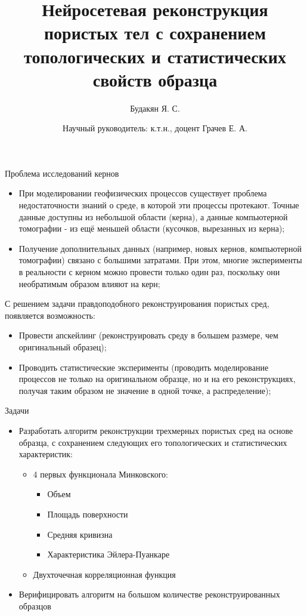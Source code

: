 \documentclass[10pt, handout, aspectratio=169]{beamer}
\begin{document}
	\title{Нейросетевая реконструкция пористых тел с сохранением топологических и статистических свойств образца}
	\author{Будакян Я. С. \and \break \break \break Научный руководитель: к.т.н., доцент Грачев Е. А.}
	\maketitle
	
	\begin{frame}{Проблема исследований кернов}
		\begin{itemize}
			\item При моделировании геофизических процессов существует проблема недостаточности знаний о среде, в которой эти процессы протекают. Точные данные доступны из небольшой области (керна), а данные компьютерной томографии - из ещё меньшей области (кусочков, вырезанных из керна);
			\item Получение дополнительных данных (например, новых кернов, компьютерной томографии) связано с большими затратами. При этом, многие эксперименты в реальности с керном можно провести только один раз, поскольку они необратимым образом влияют на керн;
		\end{itemize}
	С решением задачи правдоподобного реконструирования пористых сред, появляется возможность:
		\begin{itemize}
			\item Провести апскейлинг (реконструировать среду в большем размере, чем оригинальный образец);
			\item Проводить статистические эксперименты (проводить моделирование процессов не только на оригинальном образце, но и на его реконструкциях, получая таким образом не значение в одной точке, а распределение);
		\end{itemize}
	\end{frame}

	\begin{frame}{Задачи}
		\begin{itemize}
			\item Разработать алгоритм реконструкции трехмерных пористых сред на основе образца, с сохранением следующих его топологических и статистических характеристик:
			\begin{itemize}
				\item 4 первых функционала Минковского:
				\begin{itemize}
					\item Объем
					\item Площадь поверхности
					\item Средняя кривизна
					\item Характеристика Эйлера-Пуанкаре
				\end{itemize}
				\item Двухточечная корреляционная функция
			\end{itemize}
			\item Верифицировать алгоритм на большом количестве реконструированных образцов
		\end{itemize}
	\end{frame}
\end{document}
